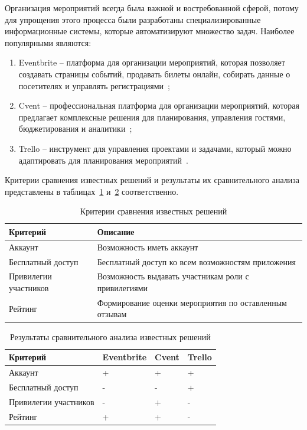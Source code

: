 Организация мероприятий всегда была важной и востребованной сферой, потому для упрощения этого процесса были разработаны специализированные информационные системы, которые автоматизируют множество задач. Наиболее популярными являются:
\begin{enumerate}
	\item Eventbrite -- платформа для организации мероприятий, которая позволяет создавать страницы событий, продавать билеты онлайн, собирать данные о посетителях и управлять регистрациями~\cite{lit2};
	\item Cvent -- профессиональная платформа для организации мероприятий, которая предлагает комплексные решения для планирования, управления гостями, бюджетирования и аналитики~\cite{lit3};
	\item Trello -- инструмент для управления проектами и задачами, который можно адаптировать для планирования мероприятий~\cite{lit4}.
\end{enumerate}

Критерии сравнения известных решений и результаты их сравнительного анализа представлены в таблицах~\ref{tbl:criteria} и~\ref{tbl:results} соответственно.

\begin{table}[h]
	\centering
	\caption{Критерии сравнения известных решений}
	\begin{tabularx}{\textwidth}{|X|X|}
		\hline
		\textbf{Критерий} & \textbf{Описание} \\
		\hline
		Аккаунт & Возможность иметь аккаунт \\
		\hline
		Бесплатный доступ & Бесплатный доступ ко всем возможностям приложения \\
		\hline
		Привилегии участников & Возможность выдавать участникам роли с привилегиями \\
		\hline
		Рейтинг & Формирование оценки мероприятия по оставленным отзывам \\
		\hline
	\end{tabularx}
	\label{tbl:criteria}
\end{table}

\begin{table}[h]
	\centering
	\caption{Результаты сравнительного анализа известных решений}
	\begin{tabularx}{\textwidth}{|X|X|X|X|}
		\hline
		\textbf{Критерий} & \textbf{Eventbrite} & \textbf{Cvent} & \textbf{Trello} \\
		\hline
		Аккаунт & + & + & + \\
		\hline
		Бесплатный доступ & - & - & + \\
		\hline
		Привилегии участников & - & + & - \\
		\hline
		Рейтинг & + & + & - \\
		\hline
	\end{tabularx}
	\label{tbl:results}
\end{table}

